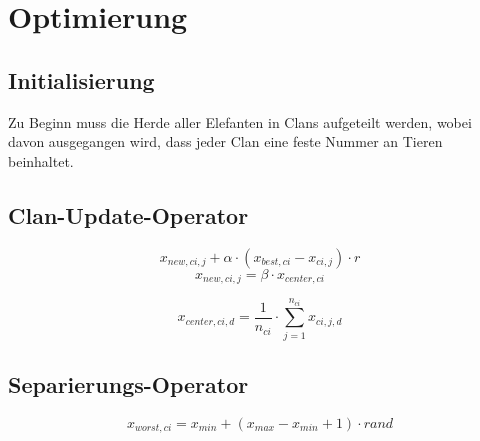 \chapter{Optimierung}
\section{Initialisierung}
Zu Beginn muss die Herde aller Elefanten in Clans aufgeteilt werden, wobei davon ausgegangen wird, dass jeder Clan eine feste Nummer an Tieren beinhaltet. 

\section{Clan-Update-Operator}
\begin{equation}
    x_{new, ci, j} + \alpha \cdot (x_{best, ci} - x_{ci, j}) \cdot r
    \label{calcXNew}
\end{equation}
\begin{equation}
    x_{new, ci, j} = \beta \cdot x_{center, ci}
    \label{calcXNewMatriarch}
\end{equation}

\begin{equation}
    x_{center, ci, d} = \frac{1}{n_{ci}} \cdot \sum_{j=1}^{n_{ci}} x_{ci,j,d}
    \label{calcXCenter}
\end{equation}

\section{Separierungs-Operator}
\begin{equation}
    x_{worst, ci} = x_{min} + (x_{max} - x_{min} + 1) \cdot rand
    \label{calcXWorst}
\end{equation}

